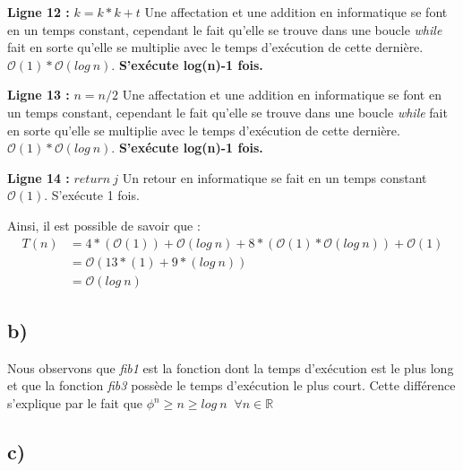 \documentclass[12pt]{article}
\begin{document}
        \noindent \textbf{Ligne 12 :} \( k = k*k + t \) \newline
  	    Une affectation et une addition en informatique se font en un temps constant, cependant le fait qu'elle se trouve dans une boucle \textit{while} fait en sorte qu'elle se multiplie avec le temps d'exécution de cette dernière.
        \( \mathcal{O}(1)*\mathcal{O}(log \: n) \). \newline
        \textbf{S'exécute log(n)-1 fois.} \newline

        \noindent \textbf{Ligne 13 :} \( n = n/2 \) \newline
  	    Une affectation et une addition en informatique se font en un temps constant, cependant le fait qu'elle se trouve dans une boucle \textit{while} fait en sorte qu'elle se multiplie avec le temps d'exécution de cette dernière.
        \( \mathcal{O}(1)*\mathcal{O}(log \: n) \). \newline
        \textbf{S'exécute log(n)-1 fois.} \newline

        \noindent \textbf{Ligne 14 :} \( return \: j \) \newline
  	    Un retour en informatique se fait en un temps constant
        \( \mathcal{O}(1) \). \newline
		S'exécute 1 fois. \newline

        \noindent Ainsi, il est possible de savoir que :
	    \begin{align*}
	       T(n) &= 4*(\mathcal{O}(1))+\mathcal{O}(log \: n)+8*( \mathcal{O}(1)*\mathcal{O}(log \: n)) + \mathcal{O}(1) \\
	   	   &= \mathcal{O}(13*(1)+9*(log \: n)) \\
	       &= \mathcal{O}(log \: n)
	    \end{align*}
  	\newpage
    \subsection*{b)}
      \noindent Nous observons que \textit{fib1} est la fonction dont la temps d'exécution est le plus long et que la fonction \textit{fib3} possède le temps d'exécution le plus court. Cette différence s'explique par le fait que \( \phi^n \geq n \geq log \: n  \; \; \forall n \in \mathbb{R} \)
    \subsection*{c)}
\end{document}
